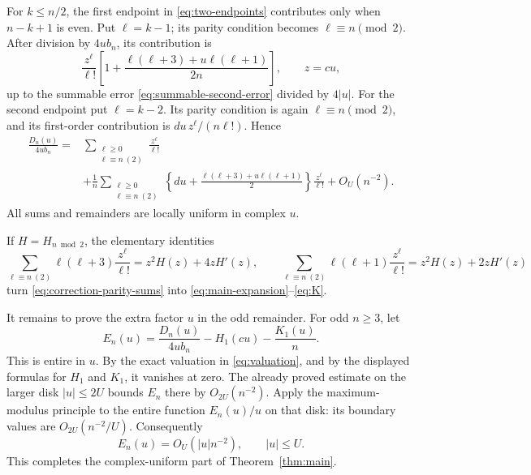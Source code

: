 For $k\le n/2$, the first endpoint in \eqref{eq:two-endpoints} contributes
only when $n-k+1$ is even. Put $\ell=k-1$; its parity condition becomes
$\ell\equiv n\pmod2$. After division by $4ub_n$, its contribution is
\[
 \frac{z^\ell}{\ell!}
 \left[1+\frac{\ell(\ell+3)+u\ell(\ell+1)}{2n}\right],
 \qquad z=cu,
\]
up to the summable error \eqref{eq:summable-second-error} divided by
$4|u|$. For the second endpoint put $\ell=k-2$. Its parity condition is
again $\ell\equiv n\pmod2$, and its first-order contribution is
$du\,z^\ell/(n\ell!)$. Hence
\begin{equation}\label{eq:correction-parity-sums}
 \begin{split}
 \frac{D_n(u)}{4ub_n}
 ={}&\sum_{\substack{\ell\ge0\\\ell\equiv n\ (2)}}\frac{z^\ell}{\ell!}\\
 &+\frac1n\sum_{\substack{\ell\ge0\\\ell\equiv n\ (2)}}
 \left\{du+\frac{\ell(\ell+3)+u\ell(\ell+1)}2\right\}
 \frac{z^\ell}{\ell!}+O_U(n^{-2}).
 \end{split}
\end{equation}
All sums and remainders are locally uniform in complex $u$.

If $H=H_{n\bmod2}$, the elementary identities
\[
 \sum_{\ell\equiv n\ (2)}\ell(\ell+3)\frac{z^\ell}{\ell!}
       =z^2H(z)+4zH'(z),
 \qquad
 \sum_{\ell\equiv n\ (2)}\ell(\ell+1)\frac{z^\ell}{\ell!}
       =z^2H(z)+2zH'(z)
\]
turn \eqref{eq:correction-parity-sums} into
\eqref{eq:main-expansion}--\eqref{eq:K}.

It remains to prove the extra factor $u$ in the odd remainder. For odd
$n\ge3$, let
\[
 E_n(u)=\frac{D_n(u)}{4ub_n}-H_1(cu)-\frac{K_1(u)}n.
\]
This is entire in $u$. By the exact valuation in \eqref{eq:valuation},
and by the displayed formulas for $H_1$ and $K_1$, it vanishes at zero.
The already proved estimate on the larger disk $|u|\le2U$ bounds
$E_n$ there by $O_{2U}(n^{-2})$. Apply the maximum-modulus principle to
the entire function $E_n(u)/u$ on that disk: its boundary values are
$O_{2U}(n^{-2}/U)$. Consequently
\begin{equation}\label{eq:odd-extra-u}
 E_n(u)=O_U(|u|n^{-2}),\qquad |u|\le U.
\end{equation}
This completes the complex-uniform part of Theorem~\ref{thm:main}.

